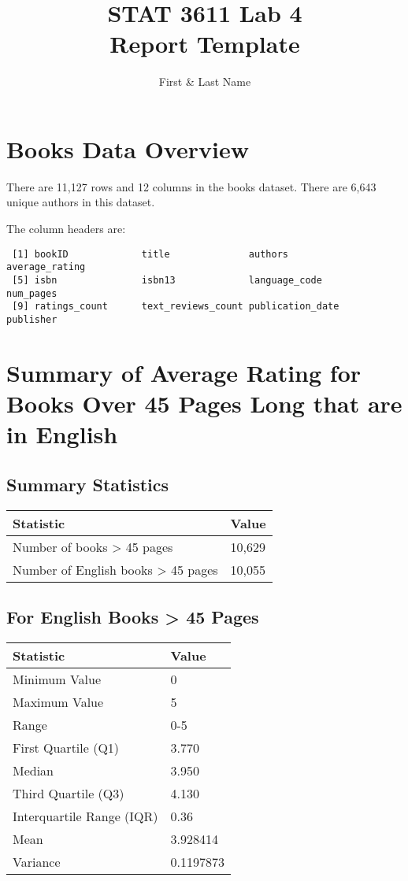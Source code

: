 \documentclass[12pt]{article}
\title{STAT 3611 Lab 4 \\ Report Template}
\author{First \& Last Name}
\date{}
\begin{document}
\maketitle

\section*{Books Data Overview}
There are 11,127 rows and 12 columns in the books dataset. There are 6,643 unique authors in this dataset.

The column headers are:
\begin{verbatim}
 [1] bookID             title              authors            average_rating    
 [5] isbn               isbn13             language_code      num_pages         
 [9] ratings_count      text_reviews_count publication_date   publisher
\end{verbatim}

\section*{Summary of Average Rating for Books Over 45 Pages Long that are in English}

\subsection*{Summary Statistics}
\begin{tabular}{l l}
    \toprule
    \textbf{Statistic} & \textbf{Value} \\
    \midrule
    Number of books > 45 pages & 10,629 \\
    Number of English books > 45 pages & 10,055 \\
    \bottomrule
\end{tabular}

\subsection*{For English Books > 45 Pages}
\begin{tabular}{l l}
    \toprule
    \textbf{Statistic} & \textbf{Value} \\
    \midrule
    Minimum Value & 0 \\
    Maximum Value & 5 \\
    Range & 0-5 \\
    First Quartile (Q1) & 3.770 \\
    Median & 3.950 \\
    Third Quartile (Q3) & 4.130 \\
    Interquartile Range (IQR) & 0.36 \\
    Mean & 3.928414 \\
    Variance & 0.1197873 \\
    \bottomrule
\end{tabular}
\end{document}

